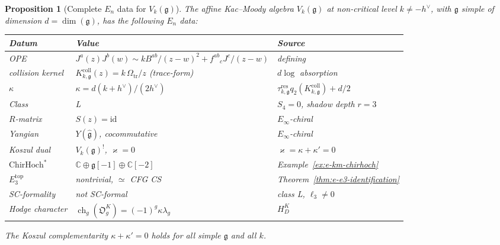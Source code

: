 \documentclass[11pt,reqno]{amsart}
\newtheorem{proposition}[theorem]{Proposition}
\theoremstyle{definition}
\theoremstyle{remark}
\providecommand{\fg}{\mathfrak{g}}
\providecommand{\Ethree}{E_3}
\providecommand{\En}{E_n}
\providecommand{\Einf}{E_\infty}
\providecommand{\ChirHoch}{\mathrm{ChirHoch}}
\providecommand{\bC}{\mathbb{C}}
\providecommand{\id}{\mathrm{id}}
\begin{document}
\begin{proposition}[Complete $\En$ data for $V_k(\fg)$]
\label{prop:e-km-complete}
The affine Kac--Moody algebra $V_k(\fg)$ at non-critical
level $k \neq -h^\vee$, with $\fg$ simple of dimension
$d = \dim(\fg)$, has the following $\En$ data:
\begin{center}
\renewcommand{\arraystretch}{1.15}
\begin{tabular}{lll}
\textbf{Datum} & \textbf{Value} & \textbf{Source} \\
\hline
\textup{OPE} &
 $J^a(z)J^b(w) \sim kB^{ab}/(z-w)^2 + f^{ab}{}_c J^c/(z-w)$
 & defining \\
\textup{collision kernel} &
 $K_{k,\fg}^{\mathrm{coll}}(z)=k\,\Omega_{\mathrm{tr}}/z$
 \textup{(trace-form)} &
 $d\log$ absorption \\
\textup{$\kappa$} &
 $\kappa = d(k + h^\vee)/(2h^\vee)$ &
 $\tau_{k,\fg}^{\mathrm{res}}q_2(K_{k,\fg}^{\mathrm{coll}})+d/2$ \\
\textup{Class} & L &
 $S_4 = 0$, shadow depth $r = 3$ \\
\textup{$R$-matrix} & $S(z) = \id$ &
 $\Einf$-chiral \\
\textup{Yangian} &
 $Y(\hat{\fg})$, cocommutative &
 $\Einf$-chiral \\
\textup{Koszul dual} &
 $V_k(\fg)^!$, $\varkappa = 0$ & $\varkappa = \kappa + \kappa' = 0$ \\
\textup{$\ChirHoch^*$} &
 $\bC \oplus \fg[-1] \oplus \bC[-2]$ &
 Example~\ref{ex:e-km-chirhoch} \\
\textup{$\Ethree^{\mathrm{top}}$} &
 nontrivial, $\simeq$ CFG CS &
 Theorem~\ref{thm:e-e3-identification} \\
\textup{SC-formality} & not SC-formal & class L, $\ell_3 \neq 0$ \\
\textup{Hodge character} &
 $\operatorname{ch}_g(\mathfrak O_g^K)=(-1)^g\kappa\lambda_g$
 & $H_D^K$
\end{tabular}
\end{center}
The Koszul complementarity $\kappa + \kappa' = 0$ holds
for all simple $\fg$ and all $k$.
\end{proposition}
\end{document}
